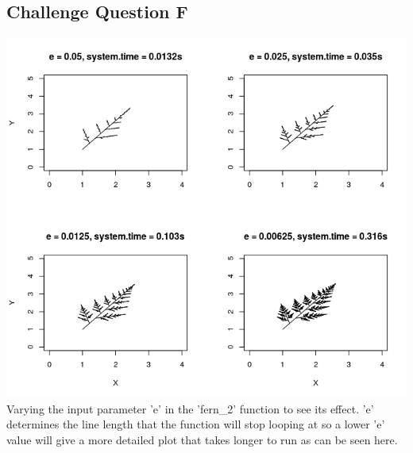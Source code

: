 \documentclass{article}
\begin{document}
\subsection*{Challenge Question F}
\begin{center}
  \includegraphics[width=\textwidth]{../Results/challenge_F.jpeg}
   {Varying the input parameter 'e' in the 'fern\_2' function to see
  its effect. 'e' determines the line length that the function will stop looping at so a lower
  'e' value will give a more detailed plot that takes longer to run as can be seen here.}
\end{center}
\end{document}
